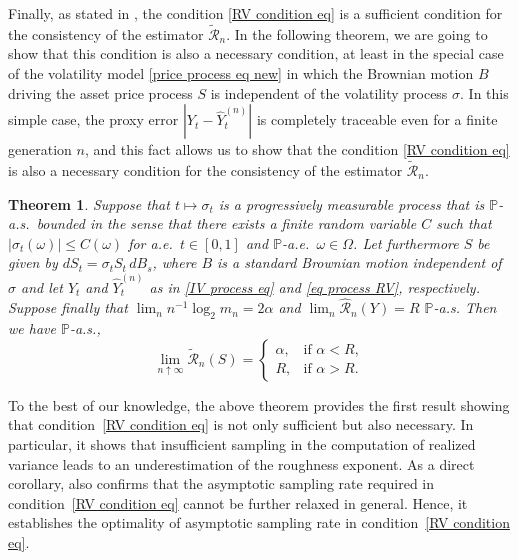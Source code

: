 \documentclass[12pt,reqno]{article}
\def\ua{\uparrow}
\def\wh{\widehat}
\def\wt{\widetilde}
\numberwithin{equation}{section}
\def\cR{{\mathscr R}}
\newtheorem{theorem}{Theorem}[section]
\theoremstyle{definition}
\def\wt#1{\widetilde{#1}}
\def\ua{\uparrow}
\def\wh{\widehat}
\def\wt{\widetilde}
\newcommand{\bP}{\mathbb{P}}
\begin{document}
	
	Finally, as stated in , the condition \eqref{RV condition eq} is a sufficient condition for the consistency of the estimator $\wt \cR_n$. In the following theorem, we are going to show that this condition is also a necessary condition, at least in the special case of the volatility model \eqref{price process eq new} in which the Brownian motion  $B$ driving the asset price process $S$ is independent of the volatility process $\sigma$.  In this simple case, the proxy error $|Y_t - \wh Y^{(n)}_t|$ is completely traceable even for a finite generation $n$, and this fact allows us to show that the condition \eqref{RV condition eq} is also a necessary condition for the consistency of the estimator $\wt \cR_n$. 
	
	\begin{theorem}\label{thm main realized necessary}
		Suppose that $t \mapsto \sigma_t$ is a progressively measurable process that is $\bP$-a.s.~bounded in the sense that there exists a finite random variable $C$ such that $|\sigma_t(\omega)| \le C(\omega)$ for a.e.~$t \in [0,1]$ and $\bP$-a.e.~$\omega \in \Omega$. 
		Let furthermore $S$ be given by $dS_t=\sigma_tS_t\,dB_s$, where $B$ is a standard Brownian motion independent of $\sigma$ and 
		let $Y_t$ and $\wh Y^{(n)}_t$  as in \eqref{IV process eq} and \eqref{eq process RV}, respectively. Suppose finally that $\lim_n n^{-1}\log_2 m_n = 2\alpha$ and $\lim_n\wh \cR_n(Y) = R$ $\bP$-a.s. Then we have $\bP$-a.s.,
		\begin{equation*}
			\lim_{n \ua \infty} \wt \cR_n(S) = \begin{cases}
				\alpha, &\text{if $\alpha < R,$}\\
				R, &\text{if $\alpha > R.$}
			\end{cases}
		\end{equation*} 
	\end{theorem}
	
To the best of our knowledge, the above theorem provides the first result showing that condition~\eqref{RV condition eq} is not only sufficient but also necessary. In particular, it shows that insufficient sampling in the computation of realized variance leads to an underestimation of the roughness exponent. As a direct corollary,  also confirms that the asymptotic sampling rate required in condition~\eqref{RV condition eq} cannot be further relaxed in general. Hence, it establishes the optimality of asymptotic sampling rate in condition~\eqref{RV condition eq}. 
\end{document}
